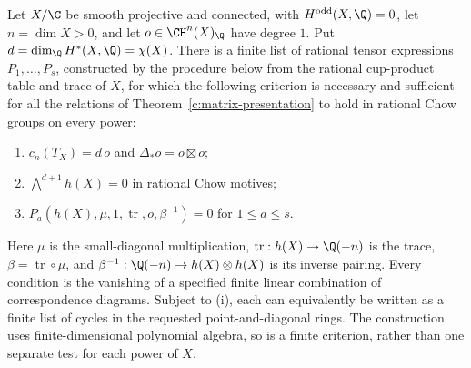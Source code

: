 \begin{theorem}
\label{c:finite-even-criterion}
Let $X/\C$ be smooth projective and connected, with $H^{\rm odd}(X,\Q)=0$,
let $n=\dim X>0$, and let $o\in\CH^n(X)_\Q$ have degree $1$.
Put $d=\dim_\Q H^*(X,\Q)=\chi(X)$.  There is a finite list of rational
tensor expressions $P_1,\ldots,P_s$, constructed by the procedure below
from the rational cup-product table and trace of $X$, for which the
following criterion is necessary and sufficient for all the relations
of Theorem~\ref{c:matrix-presentation} to hold in rational Chow groups
on every power:
\begin{enumerate}[label=(\roman*)]
\item $c_n(T_X)=d\,o$ and $\Delta_*o=o\boxtimes o$;
\item $\bigwedge^{d+1}h(X)=0$ in rational Chow motives;
\item $P_a(h(X),\mu,1,\operatorname{tr},o,\beta^{-1})=0$ for
      $1\leq a\leq s$.
\end{enumerate}
Here $\mu$ is the small-diagonal multiplication,
$\operatorname{tr}:h(X)\to\Q(-n)$ is the trace,
$\beta=\operatorname{tr}\circ\mu$, and
$\beta^{-1}:\Q(-n)\to h(X)\otimes h(X)$ is its inverse pairing.
Every condition is the vanishing of a specified finite linear
combination of correspondence diagrams.  Subject to (i), each can
equivalently be written as a finite list of cycles in the requested
point-and-diagonal rings.  The construction uses finite-dimensional
polynomial algebra, so is a finite criterion, rather than one separate
test for each power of $X$.
\end{theorem}

